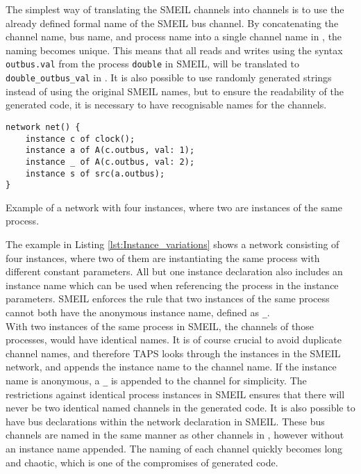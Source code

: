 The simplest way of translating the SMEIL channels into \cspm{} channels is to use the already defined formal name of the SMEIL bus channel. By concatenating the channel name, bus name, and process name into a single channel name in \cspm{}, the naming becomes unique.
This means that all reads and writes using the syntax \texttt{outbus.val} from the process \texttt{double} in SMEIL, will be translated to \texttt{double\_outbus\_val} in \cspm{}.
It is also possible to use randomly generated strings instead of using the original SMEIL names, but to ensure the readability of the generated code, it is necessary to have recognisable names for the \cspm{} channels.\\

\begin{listing}
\begin{verbatim}
network net() {
    instance c of clock();
    instance a of A(c.outbus, val: 1);
    instance _ of A(c.outbus, val: 2);
    instance s of src(a.outbus);
}
\end{verbatim}
\caption{Example of a network with four instances, where two are instances of the same process.}
\label{lst:Instance_variations}
\end{listing}
The example in Listing \ref{lst:Instance_variations} shows a network consisting of four instances, where two of them are instantiating the same process with different constant parameters. All but one instance declaration also includes an instance name which can be used when referencing the process in the instance parameters. SMEIL enforces the rule that two instances of the same process cannot both have the anonymous instance name, defined as \texttt{\_}.\\

With two instances of the same process in SMEIL, the \cspm{} channels of those processes, would have identical names. It is of course crucial to avoid duplicate channel names, and therefore TAPS looks through the instances in the SMEIL network, and appends the instance name to the \cspm{} channel name. If the instance name is anonymous, a \texttt{\_} is appended to the \cspm{} channel for simplicity. The restrictions against identical process instances in SMEIL ensures that there will never be two identical named \cspm{} channels in the generated code.
It is also possible to have bus declarations within the network declaration in SMEIL. These bus channels are named in the same manner as other channels in \cspm{}, however without an instance name appended.
The naming of each channel quickly becomes long and chaotic, which is one of the compromises of generated code.
